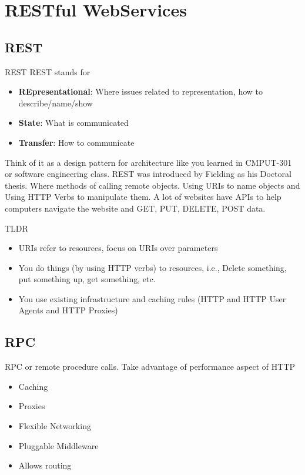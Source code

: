 \documentclass[../CMPUT-404-Notes.tex]{subfiles}
\begin{document}
\chapter{RESTful WebServices}
\section{REST}
\begin{Definition}
  {REST}
  REST stands for 
  \begin{itemize}
    \item \textbf{REpresentational}: Where issues related to representation, how to describe/name/show
    \item \textbf{State}: What is communicated
    \item \textbf{Transfer}: How to communicate
  \end{itemize}
\end{Definition}
Think of it as a design pattern for architecture like you learned in CMPUT-301 or software engineering class.
REST was introduced by Fielding as his Doctoral thesis.
Where methods of calling remote objects. Using URIs to name objects and Using HTTP Verbs to manipulate them.
A lot of websites have APIs to help computers navigate the website and GET, PUT, DELETE,  POST data.

\begin{DndSidebar}[color=PhbLightGreen]{TLDR}
  \begin{itemize}
    \item URIs refer to resources, focus on URIs over parameters
    \item You do things (by using HTTP verbs) to resources, i.e., Delete something, put something up, get something, etc.
    \item You use existing infrastructure and caching rules (HTTP and HTTP User Agents and HTTP Proxies)
  \end{itemize}
  
\end{DndSidebar}

\section{RPC}
RPC or remote procedure calls.
Take advantage of performance aspect of HTTP
\begin{itemize}
  \item Caching
  \item Proxies
  \item Flexible Networking
  \item Pluggable Middleware
  \item Allows routing
\end{itemize}
\end{document}
